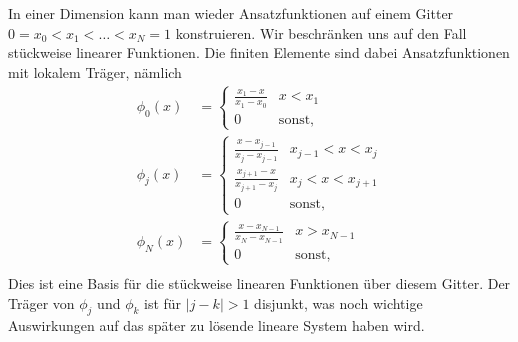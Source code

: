 In einer Dimension kann man wieder Ansatzfunktionen auf einem Gitter $0=x_0 < x_1 < \ldots < x_N =1$ konstruieren. Wir beschr\"anken uns auf den Fall st\"uckweise linearer Funktionen. Die finiten Elemente sind dabei Ansatzfunktionen mit lokalem Tr\"ager, n\"amlich
\begin{align*}
\phi_0(x) &= \left\{ \begin{array}{ll}\frac{x_1-x}{x_1-x_0}  & x  < x_1 \\  0 & \text{sonst,} \end{array} \right. \\
\phi_j(x) &= \left\{ \begin{array}{ll}\frac{x-x_{j-1}}{x_j-x_{j-1}}  & x_{j-1} < x  < x_j \\ 
\frac{x_{j+1}-x}{x_{j+1}-x_{j}}  & x_{j} < x  < x_{j+1} \\ 0 & \text{sonst,} \end{array} \right. \\
\phi_N(x) &= \left\{ \begin{array}{ll}\frac{x-x_{N-1}}{x_N-x_{N-1}}  & x  > x_{N-1} \\  0 & \text{sonst,} \end{array} \right. \\
\end{align*}
Dies ist eine Basis f\"ur die st\"uckweise linearen Funktionen \"uber diesem Gitter. Der Tr\"ager von $\phi_j$ und $\phi_k$ ist f\"ur $\vert j - k \vert > 1$ disjunkt, was noch wichtige Auswirkungen auf das sp\"ater zu l\"osende lineare System haben wird. 

